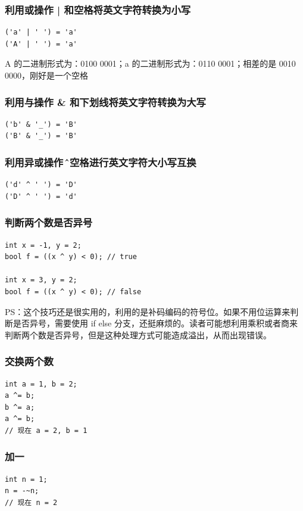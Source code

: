 \documentclass[12pt]{article}
\begin{document}
\subsubsection{利用或操作 | 和空格将英文字符转换为小写}
\begin{lstlisting}
('a' | ' ') = 'a'
('A' | ' ') = 'a'
\end{lstlisting}
\begin{framed}
A 的二进制形式为：0100 0001；a 的二进制形式为：0110 0001；相差的是 0010 0000，刚好是一个空格
\end{framed}

\subsubsection{利用与操作 \& 和下划线将英文字符转换为大写}
\begin{lstlisting}
('b' & '_') = 'B'
('B' & '_') = 'B'
\end{lstlisting}

\subsubsection{利用异或操作 \^ 和空格进行英文字符大小写互换}
\begin{lstlisting}
('d' ^ ' ') = 'D'
('D' ^ ' ') = 'd'
\end{lstlisting}

\subsubsection{判断两个数是否异号}
\begin{lstlisting}
int x = -1, y = 2;
bool f = ((x ^ y) < 0); // true

int x = 3, y = 2;
bool f = ((x ^ y) < 0); // false
\end{lstlisting}
PS：这个技巧还是很实用的，利用的是补码编码的符号位。如果不用位运算来判断是否异号，需要使用 if else 分支，还挺麻烦的。读者可能想利用乘积或者商来判断两个数是否异号，但是这种处理方式可能造成溢出，从而出现错误。

\subsubsection{交换两个数}
\begin{lstlisting}
int a = 1, b = 2;
a ^= b;
b ^= a;
a ^= b;
// 现在 a = 2, b = 1
\end{lstlisting}

\subsubsection{加一}
\begin{lstlisting}
int n = 1;
n = -~n;
// 现在 n = 2
\end{lstlisting}
\end{document}
